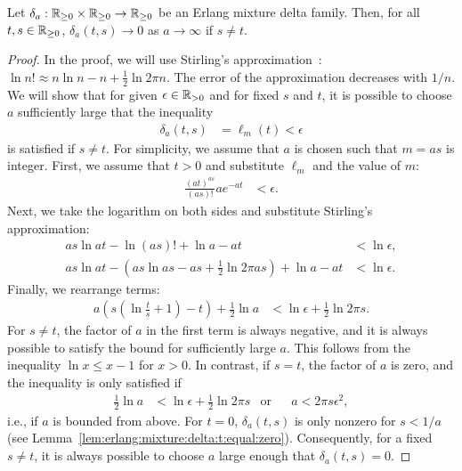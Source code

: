 %
\begin{lemma}\label{lem:erlang:mixture:delta:family:convergence:to:zero}
	Let $\delta_a: \mathbb{R}_{\geq 0} \times \mathbb{R}_{\geq 0} \rightarrow \mathbb{R}_{\geq 0}$ be an Erlang mixture delta family. Then, for all $t, s \in \mathbb{R}_{\geq 0}$, $\delta_a(t, s) \rightarrow 0$ as $a \rightarrow \infty$ if $s \neq t$.
\end{lemma}
%
\begin{proof}
	In the proof, we will use Stirling's approximation~\cite{Romik:2000}: $\ln n! \approx n \ln n - n + \frac{1}{2} \ln 2 \pi n$.
	The error of the approximation decreases with $1/n$. We will show that for given $\epsilon \in \mathbb{R}_{> 0}$ and for fixed $s$ and $t$, it is possible to choose $a$ sufficiently large that the inequality
	\begin{align}
		\delta_a(t, s) &= \ell_m(t) < \epsilon
	\end{align}
	is satisfied if $s \neq t$. For simplicity, we assume that $a$ is chosen such that $m = as$ is integer. First, we assume that $t > 0$ and substitute $\ell_m$ and the value of $m$:
	\begin{align}
		\frac{(at)^{as}}{(as)!} a e^{-at} &< \epsilon.
	\end{align}
	Next, we take the logarithm on both sides and substitute Stirling's approximation:
	\begin{subequations}
		\begin{align}
			as \ln at - \ln (as)! + \ln a - at &< \ln \epsilon, \\
			as \ln at - \left(as \ln as - as + \frac{1}{2} \ln 2 \pi as\right) + \ln a - at &< \ln \epsilon.
		\end{align}
	\end{subequations}
	Finally, we rearrange terms:
	\begin{align}
		a \left(s \left(\ln \frac{t}{s} + 1\right) - t\right) + \frac{1}{2} \ln a &< \ln \epsilon + \frac{1}{2} \ln 2 \pi s.
	\end{align}
	For $s \neq t$, the factor of $a$ in the first term is always negative, and it is always possible to satisfy the bound for sufficiently large $a$. This follows from the inequality $\ln x \leq x - 1$ for $x > 0$. In contrast, if $s = t$, the factor of $a$ is zero, and the inequality is only satisfied if
	\begin{align}
		\frac{1}{2} \ln a &< \ln \epsilon + \frac{1}{2} \ln 2 \pi s & \mathrm{or} &&
		a < 2 \pi s \epsilon^2,
	\end{align}
	i.e., if $a$ is bounded from above. For $t = 0$, $\delta_a(t, s)$ is only nonzero for $s < 1/a$ (see Lemma~\ref{lem:erlang:mixture:delta:t:equal:zero}). Consequently, for a fixed $s \neq t$, it is always possible to choose $a$ large enough that $\delta_a(t, s) = 0$.
\end{proof}

